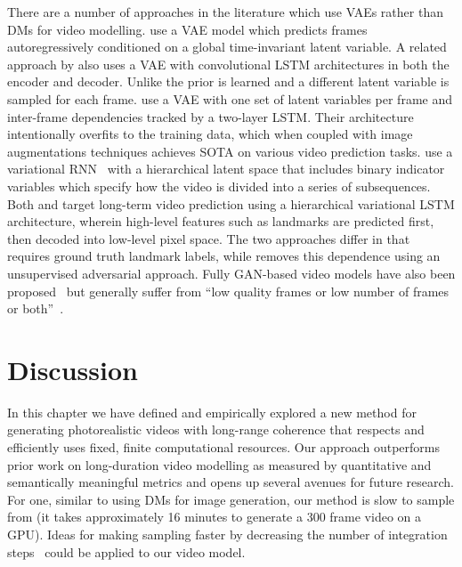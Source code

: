 There are a number of approaches in the literature which use VAEs rather than DMs for video modelling. \citet{babaeizadeh2017stochastic} use a VAE model which predicts frames autoregressively conditioned on a global time-invariant latent variable. A related approach by \citet{denton2018stochastic} also uses a VAE with convolutional LSTM architectures in both the encoder and decoder. Unlike \citet{babaeizadeh2017stochastic} the prior is learned and a different latent variable is sampled for each frame. \citet{babaeizadeh2021fitvid} use a VAE with one set of latent variables per frame and inter-frame dependencies tracked by a two-layer LSTM. Their architecture intentionally overfits to the training data, which when coupled with image augmentations techniques achieves SOTA on various video prediction tasks.  \citet{kim2019variational} use a variational RNN~\citep{chung2015recurrent} with a hierarchical latent space that includes binary indicator variables which specify how the video is divided into a series of subsequences. Both \citet{villegas2018hierarchical} and \citet{wichers2018learning} target long-term video prediction using a hierarchical variational LSTM architecture, wherein high-level features such as landmarks are predicted first, then decoded into low-level pixel space. The two approaches differ in that \citet{villegas2018hierarchical} requires ground truth landmark labels, while \cite{wichers2018learning} removes this dependence using an unsupervised adversarial approach. Fully GAN-based video models have also been proposed~\citep{aldausari2022video,clark2019adversarial} but generally suffer from ``low quality frames or low number of frames or both''~\citep{aldausari2022video}.

\section{Discussion}

In this chapter we have defined and empirically explored a new method for generating photorealistic videos with long-range coherence that respects and efficiently uses fixed, finite computational resources.
Our approach outperforms prior work on long-duration video modelling as measured by quantitative and semantically meaningful metrics and opens up several avenues for future research.
For one, similar to using DMs for image generation, our method is slow to sample from (it takes approximately 16 minutes to generate a 300 frame video on a GPU).  Ideas for making sampling faster by decreasing the number of integration steps~\citep{salimans2022progressive,song2020denoising,xiao2022tackling} could be applied to our video model.  

